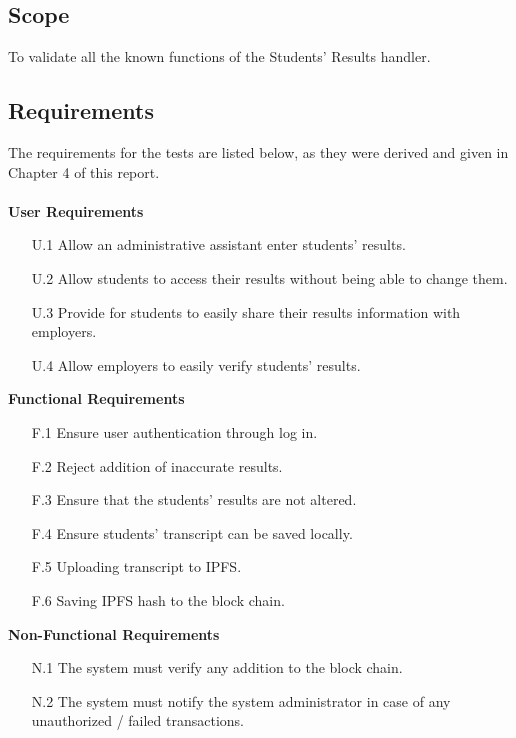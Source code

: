 \subsection{Scope}
To validate all the known functions of the Students' Results handler.
\subsection{Requirements}
The requirements for the tests are listed below, as they were derived and given in Chapter 4 of this report.\\\\
\textbf{User Requirements}
\begin{enumerate}
\item[U.1] Allow an administrative assistant enter students’ results.
\item[U.2] Allow students to access their results without being able to change them.
\item[U.3] Provide for students to easily share their results information with employers.
\item[U.4] Allow employers to easily verify students' results.
\end{enumerate}
\textbf{Functional Requirements}
\begin{enumerate}
\item[F.1] Ensure user authentication through log in.
\item[F.2] Reject addition of inaccurate results.
\item[F.3] Ensure that the students’ results are not altered.
\item[F.4] Ensure students' transcript can be saved locally.
\item[F.5] Uploading transcript to IPFS.
\item[F.6] Saving IPFS hash to the block chain.
\end{enumerate}
\textbf{Non-Functional Requirements}
\begin{enumerate}
\item[N.1] The system must verify any addition to the block chain.
\item[N.2] The system must notify the system administrator in case of any unauthorized / failed transactions.
\end{enumerate}

